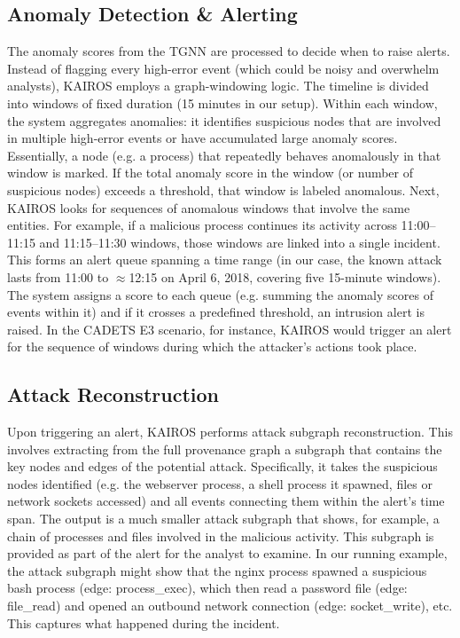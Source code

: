 \documentclass[conference]{IEEEtran}
\begin{document}
\subsection{Anomaly Detection \& Alerting}
The anomaly scores from the TGNN are processed to decide when to raise alerts. Instead of flagging every high-error event (which could be noisy and overwhelm analysts), KAIROS employs a graph-windowing logic. The timeline is divided into windows of fixed duration (15 minutes in our setup). Within each window, the system aggregates anomalies: it identifies suspicious nodes that are involved in multiple high-error events or have accumulated large anomaly scores. Essentially, a node (e.g. a process) that repeatedly behaves anomalously in that window is marked. If the total anomaly score in the window (or number of suspicious nodes) exceeds a threshold, that window is labeled anomalous. Next, KAIROS looks for sequences of anomalous windows that involve the same entities. For example, if a malicious process continues its activity across 11:00--11:15 and 11:15--11:30 windows, those windows are linked into a single incident. This forms an alert queue spanning a time range (in our case, the known attack lasts from 11:00 to $\approx$12:15 on April 6, 2018, covering five 15-minute windows). The system assigns a score to each queue (e.g. summing the anomaly scores of events within it) and if it crosses a predefined threshold, an intrusion alert is raised. In the CADETS E3 scenario, for instance, KAIROS would trigger an alert for the sequence of windows during which the attacker's actions took place.

\subsection{Attack Reconstruction}
Upon triggering an alert, KAIROS performs attack subgraph reconstruction. This involves extracting from the full provenance graph a subgraph that contains the key nodes and edges of the potential attack. Specifically, it takes the suspicious nodes identified (e.g. the webserver process, a shell process it spawned, files or network sockets accessed) and all events connecting them within the alert's time span. The output is a much smaller attack subgraph that shows, for example, a chain of processes and files involved in the malicious activity. This subgraph is provided as part of the alert for the analyst to examine. In our running example, the attack subgraph might show that the nginx process spawned a suspicious bash process (edge: process\_exec), which then read a password file (edge: file\_read) and opened an outbound network connection (edge: socket\_write), etc. This captures what happened during the incident.
\end{document}
